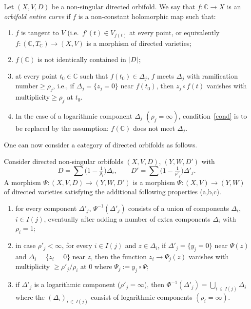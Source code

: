 \documentclass[AHL,Unicode,longabstracts,published]{cedram}
\DeclarePairedDelimiter{\abs}{\lvert}{\rvert}
\newcommand*\bC{\mathbb{C}}
\let\geq\geqslant
\begin{document}
\begin{defi}
Let $(X,V,D)$ be a non-singular directed orbifold. We say that $f\colon\bC\to X$ is an \emph{orbifold entire curve} if $f$ is a non-constant holomorphic map such that:
\begin{enumerate}
\item
$f$ is tangent to $V$ (i.e.\ $f'(t)\in V_{f(t)}$ at every point, or equivalently $f\colon(\bC,T_\bC)\to (X,V)$ is a morphism of directed varieties;
\item
$f(\bC)$ is not identically contained in $\abs{D}$;
\item\label{cond}
at every point $t_0\in\bC$ such that $f(t_0)\in\Delta_j$, $f$ meets $\Delta_j$ with ramification number${}\geq\rho_j$, i.e., if $\Delta_j=\{z_j=0\}$ near $f(t_0)$, then $z_j\circ f(t)$ vanishes with multiplicity${}\geq\rho_j$ at $t_0$.
\item[(\arabic{enumi}\ensuremath{'})] In the case of a logarithmic component $\Delta_j$ $(\rho_j=\infty)$, condition~\eqref{cond} is to be replaced by the assumption: $f(\bC)$ does not meet $\Delta_j$.
\end{enumerate}
\end{defi}

One can now consider a category of directed orbifolds as follows.
\begin{defi}
Consider directed non-singular orbifolds $(X,V,D)$, $(Y,W,D')$ with
\[
D=\sum\Big(1-\tfrac{1}{\rho_i}\Big)\Delta_i,\qquad D'=\sum\Big(1-\tfrac{1}{\rho'_j}\Big)\Delta'_j.
\]
A morphism $\Psi\colon(X,V,D)\to(Y,W,D')$ is a morphism $\Psi\colon(X,V)\to(Y,W)$ of directed varieties satisfying the additional following properties {\rm(a,b,c)}.
\begin{enumerate}
\item for every component $\Delta'_j$, $\Psi^{-1}(\Delta'_j)$ consists of a union of components $\Delta_i$, $i\in I(j)$, eventually after adding a number of extra components $\Delta_i$ with $\rho_i=1$;
\item in case $\rho'_j<\infty$, for every $i\in I(j)$ and $z\in\Delta_i$, if $\Delta'_j=\{y_j=0\}$ near $\Psi(z)$ and $\Delta_i=\{z_i=0\}$ near $z$, then the function $z_i \to \Psi_j(z)$ vanishes with multiplicity ${}\geq \rho'_j/\rho_i $ at $0$ where $\Psi_j:=y_j \circ \Psi $;
\item if $\Delta'_j$ is a logarithmic component ($\rho'_j=\infty$), then $\Phi^{-1}(\Delta'_j)= \bigcup_{i\,\in\,I(j)}\Delta_i$ where the $(\Delta_i)_{i\,\in\,I(j)}$ consist of logarithmic components $(\rho_i=\infty)$.
\end{enumerate}
\end{defi}
\end{document}
